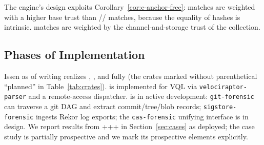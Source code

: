 The engine's design exploits Corollary~\ref{cor:c-anchor-free}: 
matches are weighted with a higher base trust than //
matches, because the equality of hashes is intrinsic.  matches are
weighted by the channel-and-storage trust of the collection.

\subsection{Phases of Implementation}

Issen as of writing realizes , , and  fully (the
crates marked without parenthetical ``planned'' in
Table~\ref{tab:crates}).  is implemented for VQL via
\texttt{velociraptor-parser} and a remote-access dispatcher.  is
in active development: \texttt{git-forensic} can traverse a git DAG and
extract commit/tree/blob records; \texttt{sigstore-forensic} ingests Rekor
log exports; the \texttt{cas-forensic} unifying interface is in design. We
report results from +++ in
Section~\ref{sec:cases} as deployed; the  case study is partially
prospective and we mark its prospective elements explicitly.
